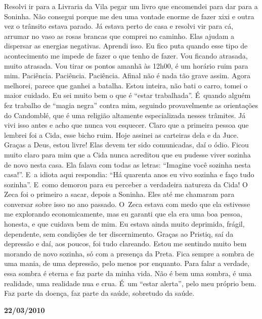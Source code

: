 Resolvi ir para a Livraria da Vila pegar um livro que encomendei para
dar para a Soninha. Não consegui porque me deu uma vontade enorme de
fazer xixi e outra vez o trânsito estava parado. Já estava perto de casa
e resolvi vir para cá, arrumar no vaso as rosas brancas que comprei no
caminho. Elas ajudam a dispersar as energias negativas. Aprendi isso. Eu
fico puta quando esse tipo de acontecimento me impede de fazer o que
tenho de fazer. Vou ficando atrasada, muito atrasada. Vou tirar os
pontos amanhã às 12h00, é um horário ruim para mim. Paciência.
Paciência. Paciência. Afinal não é nada tão grave assim. Agora melhorei,
parece que ganhei a batalha. Estou inteira, não bati o carro, tomei o
maior cuidado. Eu sei muito bem o que é ``estar trabalhada''. É~quando
alguém fez trabalho de ``magia negra'' contra mim, seguindo
provavelmente as orientações do Candomblé, que é uma religião altamente
especializada nesses trâmites. Já vivi isso antes e acho que nunca vou
esquecer. Claro que a primeira pessoa que lembrei foi a Cida, esse bicho
ruim. Hoje assinei as carteiras dela e da Juce. Graças a Deus, estou
livre! Elas devem ter sido comunicadas, daí o ódio. Ficou muito claro
para mim que a Cida nunca acreditou que eu pudesse viver sozinha de novo
nesta casa. Ela falava com todas as letras: ``Imagine você sozinha nesta
casa!''. E~a idiota aqui respondia: ``Há quarenta anos eu vivo sozinha e
faço tudo sozinha''. E~como demorou para eu perceber a verdadeira
natureza da Cida! O Zeca foi o primeiro a sacar, depois a Soninha. Eles
até me chamaram para conversar sobre isso no ano passado. O~Zeca estava
com medo que ela estivesse me explorando economicamente, mas eu garanti
que ela era uma boa pessoa, honesta, e que cuidava bem de mim. Eu estava
ainda muito deprimida, frágil, dependente, sem condições de ter
discernimento. Graças ao Pristiq, saí da depressão e daí, aos poucos,
foi tudo clareando. Estou me sentindo muito bem morando de novo sozinha,
só com a presença da Preta. Fica sempre a sombra de uma mania, de uma
depressão, pelo menos por enquanto. Para falar a verdade, essa sombra é
eterna e faz parte da minha vida. Não é bem uma sombra, é uma realidade,
uma realidade nua e crua. É~um ``estar alerta'', pelo meu próprio bem.
Faz parte da doença, faz parte da saúde, sobretudo da saúde.

\begin{center}\textbf{\asterisc{}}\end{center}


\begin{flushright}\textbf{22/03/2010}\end{flushright}



